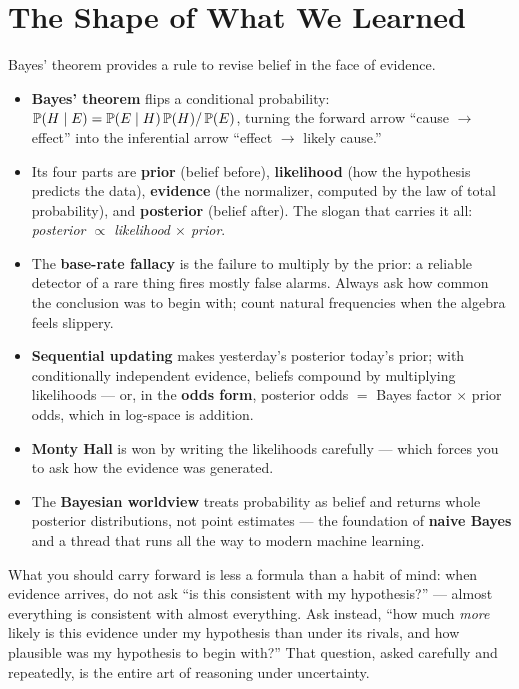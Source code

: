 \section{The Shape of What We Learned}
\label{ch05:summary}

Bayes' theorem provides a rule to revise belief in the face of evidence.

\begin{itemize}
\item \textbf{Bayes' theorem} flips a conditional probability:
$\operatorname{\mathbb{P}}(H\mid E) = \operatorname{\mathbb{P}}(E\mid H)\operatorname{\mathbb{P}}(H)/\operatorname{\mathbb{P}}(E)$, turning the forward arrow ``cause $\to$
effect'' into the inferential arrow ``effect $\to$ likely cause.''
\item Its four parts are \textbf{prior} (belief before), \textbf{likelihood} (how the
hypothesis predicts the data), \textbf{evidence} (the normalizer, computed by the law of
total probability), and \textbf{posterior} (belief after). The slogan that carries it all:
\emph{posterior $\propto$ likelihood $\times$ prior}.
\item The \textbf{base-rate fallacy} is the failure to multiply by the prior: a reliable
detector of a rare thing fires mostly false alarms. Always ask how common the conclusion
was to begin with; count natural frequencies when the algebra feels slippery.
\item \textbf{Sequential updating} makes yesterday's posterior today's prior; with
conditionally independent evidence, beliefs compound by multiplying likelihoods --- or,
in the \textbf{odds form}, posterior odds $=$ Bayes factor $\times$ prior odds, which in
log-space is addition.
\item \textbf{Monty Hall} is won by writing the likelihoods carefully --- which forces you to ask
how the evidence was generated.
\item The \textbf{Bayesian worldview} treats probability as belief and returns whole
posterior distributions, not point estimates --- the foundation of \textbf{naive
Bayes} and a thread that runs all the way to modern machine learning.
\end{itemize}

What you should carry forward is less a formula than a habit of mind: when evidence
arrives, do not ask ``is this consistent with my hypothesis?'' --- almost everything is
consistent with almost everything. Ask instead, ``how much \emph{more} likely is this
evidence under my hypothesis than under its rivals, and how plausible was my hypothesis to
begin with?'' That question, asked carefully and repeatedly, is the entire art of reasoning
under uncertainty.

